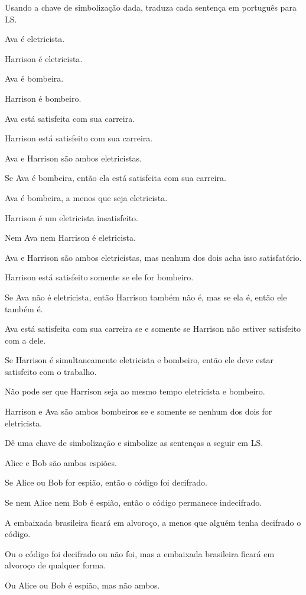 \solutions
\problempart Usando a chave de simbolização dada, traduza cada sentença em português para LS.
\label{pr.avacareer}
\begin{ekey}
\item[E$_1$:] Ava é eletricista.
\item[E$_2$:] Harrison é eletricista.
\item[F$_1$:] Ava é bombeira.
\item[F$_2$:] Harrison é bombeiro.
\item[S$_1$:] Ava está satisfeita com sua carreira.
\item[S$_2$:] Harrison está satisfeito com sua carreira.
\end{ekey}
\begin{earg}
\item Ava e Harrison são ambos eletricistas.
\item Se Ava é bombeira, então ela está satisfeita com sua carreira.
\item Ava é bombeira, a menos que seja eletricista.
\item Harrison é um eletricista insatisfeito.
\item Nem Ava nem Harrison é eletricista.
\item Ava e Harrison são ambos eletricistas, mas nenhum dos dois acha isso satisfatório.
\item Harrison está satisfeito somente se ele for bombeiro.
\item Se Ava não é eletricista, então Harrison também não é, mas se ela é, então ele também é.
\item Ava está satisfeita com sua carreira se e somente se Harrison não estiver satisfeito com a dele.
\item Se Harrison é simultaneamente eletricista e bombeiro, então ele deve estar satisfeito com o trabalho.
\item Não pode ser que Harrison seja ao mesmo tempo eletricista e bombeiro.
\item Harrison e Ava são ambos bombeiros se e somente se nenhum dos dois for eletricista.
\end{earg}




\solutions
\problempart
\label{pr.spies}
Dê uma chave de simbolização e simbolize as sentenças a seguir em LS.
\begin{earg}
\item Alice e Bob são ambos espiões.
\item Se Alice ou Bob for espião, então o código foi decifrado.
\item Se nem Alice nem Bob é espião, então o código permanece indecifrado.
\item A embaixada brasileira ficará em alvoroço, a menos que alguém tenha decifrado o código.
\item Ou o código foi decifrado ou não foi, mas a embaixada brasileira ficará em alvoroço de qualquer forma.
\item Ou Alice ou Bob é espião, mas não ambos.
\end{earg}


